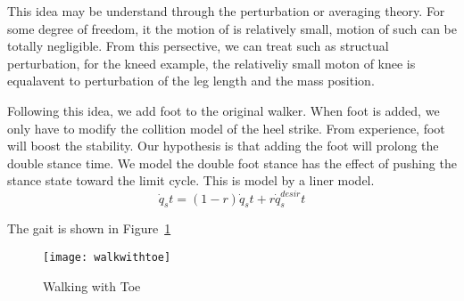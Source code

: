 {This idea may be understand through the perturbation or averaging theory\citep{khalil2002nonlinear}.
For some degree of freedom, it the motion of \dof is relatively small, motion of such \dof can be totally negligible.
From this persective, we can treat such \dof as structual perturbation, for the kneed example, the relativeliy small moton of knee is equalavent to perturbation of the leg length and the mass position.










Following this idea, we add foot to the original walker.
When foot is added, we only have to modify the collition model of the heel strike.
From experience, foot will boost the stability.
Our hypothesis is that adding the foot will prolong the double stance time.
We model the double foot stance has the effect of pushing the stance state toward the limit cycle.
This is model by a liner model.
\begin{equation}
\dot{q}_st=(1-r)\dot{q}_st+r\dot{q}^{desir}_st
\end{equation}



The gait is shown in Figure~\ref{fig:ToeGait}

\begin{figure}[!htbp]
  \begin{center}
      \texttt{[image: walkwithtoe]}
    \caption{Walking with Toe}
    \label{fig:ToeGait}
\end{center}
\end{figure}
























}
